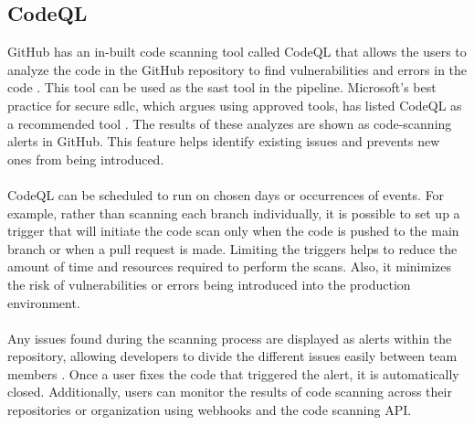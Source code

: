 \subsection{CodeQL}
GitHub has an in-built code scanning tool called CodeQL that allows the users to analyze the code in the GitHub repository to find vulnerabilities and errors in the code \cite{CodeQL1}. This tool can be used as the \acrshort{sast} tool in the \gls{pipeline}. Microsoft's best practice for secure \acrshort{sdlc}, which  argues using approved tools, has listed CodeQL as a recommended tool \cite{microsoftSDLCpractices}. The results of these analyzes are shown as code-scanning alerts in GitHub. This feature helps identify existing issues and prevents new ones from being introduced. 
\\~\\
CodeQL can be scheduled to run on chosen days or occurrences of events. For example, rather than scanning each branch individually, it is possible to set up a trigger that will initiate the code scan only when the code is pushed to the main branch or when a pull request is made. Limiting the triggers helps to reduce the amount of time and resources required to perform the scans. Also, it minimizes the risk of vulnerabilities or errors being introduced into the production environment.
\\~\\
Any issues found during the scanning process are displayed as alerts within the repository, allowing developers to divide the different issues easily between team members \cite{GithubCodeScanning}. Once a user fixes the code that triggered the alert, it is automatically closed. Additionally, users can monitor the results of code scanning across their repositories or organization using webhooks and the code scanning API. 


